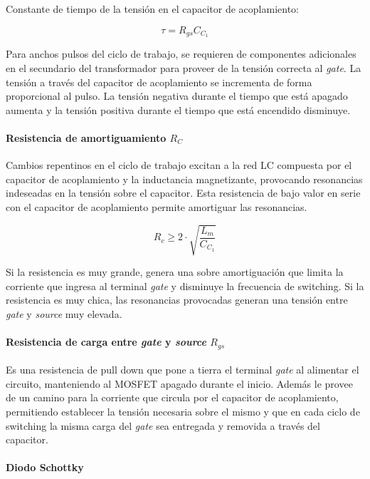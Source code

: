 Constante de tiempo de la tensión en el capacitor de acoplamiento:

$$ \tau=R_{gs}C_{C_1} $$

Para anchos pulsos del ciclo de trabajo, se requieren de componentes adicionales 
en el secundario del transformador para proveer de la tensión correcta al \textit{gate}. 
La tensión a través del capacitor de acoplamiento se incrementa de forma proporcional al pulso. 
La tensión negativa durante el tiempo que está apagado aumenta y la tensión positiva durante el tiempo que está encendido disminuye. 


\paragraph{Resistencia de amortiguamiento $R_C$}

Cambios repentinos en el ciclo de trabajo excitan a la red LC compuesta por el capacitor de acoplamiento 
y la inductancia magnetizante, provocando resonancias indeseadas en la tensión sobre el capacitor. 
Esta resistencia de bajo valor en serie con el capacitor de acoplamiento permite amortiguar las resonancias. 

$$ R_c\geq2\cdot\sqrt{\frac{L_m}{C_{C_1}}} $$

Si la resistencia es muy grande, genera una sobre amortiguación que limita la corriente que ingresa al terminal \textit{gate} y disminuye la frecuencia de switching. 
Si la resistencia es muy chica, las resonancias provocadas generan una tensión entre \textit{gate} y \textit{source} muy elevada.

\paragraph{Resistencia de carga entre \textit{gate} y \textit{source} $R_{gs}$}

Es una resistencia de pull down que pone a tierra el terminal \textit{gate} al alimentar el circuito, manteniendo al MOSFET apagado durante el inicio. 
Además le provee de un camino para la corriente que circula por el capacitor de acoplamiento, 
permitiendo establecer la tensión necesaria sobre el mismo y que en cada ciclo de switching 
la misma carga del \textit{gate} sea entregada y removida a través del capacitor. 

\paragraph{Diodo Schottky}

